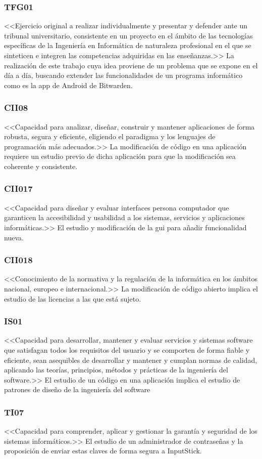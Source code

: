 \subsubsection{TFG01}
<<Ejercicio original a realizar individualmente y presentar y defender ante un tribunal
universitario, consistente en un proyecto en el ámbito de las tecnologías específicas de la
Ingeniería en Informática de naturaleza profesional en el que se sinteticen e integren las
competencias adquiridas en las enseñanzas.>>\newline
La realización de este trabajo cuya idea proviene de un problema que se expone en el día a día, buscando extender las funcionalidades de un programa informático  como es la app de Android de Bitwarden.

\subsubsection{CII08}
<<Capacidad para analizar, diseñar, construir y mantener aplicaciones de forma robusta, segura
y eficiente, eligiendo el paradigma y los lenguajes de programación más adecuados.>>\newline
La modificación de código en una aplicación  requiere un estudio previo de dicha aplicación para que la modificación sea coherente y consistente.

\subsubsection{CII017}
<<Capacidad para diseñar y evaluar interfaces persona computador que garanticen la
accesibilidad y usabilidad a los sistemas, servicios y aplicaciones informáticas.>>\newline
El estudio y modificación de la \gls{gui} para añadir funcionalidad nueva.

\subsubsection{CII018}
<<Conocimiento de la normativa y la regulación de la informática en los ámbitos nacional,
europeo e internacional.>>\newline
La modificación de código abierto implica el estudio de las licencias a las que está sujeto.

\subsubsection{IS01}
<<Capacidad para desarrollar, mantener y evaluar servicios y sistemas software que
satisfagan todos los requisitos del usuario y se comporten de forma fiable y
eficiente, sean asequibles de desarrollar y mantener y cumplan normas de
calidad, aplicando las teorías, principios, métodos y prácticas de la ingeniería del
software.>>
El estudio de un código en una aplicación  implica el estudio de patrones de diseño de la ingeniería del software

\subsubsection{TI07}
<<Capacidad para comprender, aplicar y gestionar la garantía y seguridad de los sistemas
informáticos.>>\newline
El estudio de un administrador de contraseñas y la proposición de enviar estas claves de forma segura a InputStick.